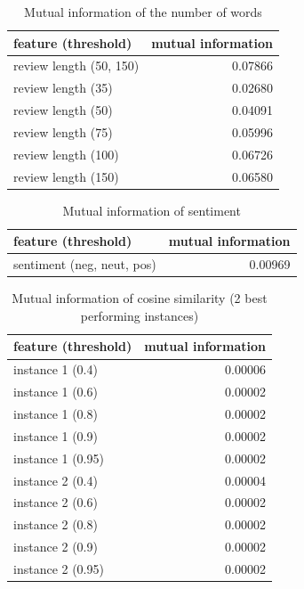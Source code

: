 \begin{table}[h!]

\centering
\begin{tabular}{lr}
\toprule
\textbf{feature (threshold)} & \textbf{mutual information} \\
\midrule
review length (50, 150) & 0.07866 \\
review length (35) & 0.02680 \\
review length (50) & 0.04091 \\
review length (75) & 0.05996 \\
review length (100) & 0.06726 \\
review length (150) & 0.06580 \\

\bottomrule
\end{tabular}
\caption{Mutual information of the number of words}\label{tab:mi_words}
\end{table}

\begin{table}[h!]
\centering
\begin{tabular}{lr}
\toprule
\textbf{feature (threshold)} & \textbf{mutual information} \\
\midrule
sentiment (neg, neut, pos) & 0.00969 \\
\bottomrule
\end{tabular}
\caption{Mutual information of sentiment}\label{tab:mi_sentiment}
\end{table}



\begin{table}[h!]
\centering
\begin{tabular}{lr}
\toprule
\textbf{feature (threshold)} & \textbf{mutual information} \\
\midrule
instance 1 (0.4) & 0.00006 \\
instance 1 (0.6) & 0.00002 \\
instance 1 (0.8) & 0.00002 \\
instance 1 (0.9) & 0.00002 \\
instance 1 (0.95) & 0.00002 \\
instance 2 (0.4) & 0.00004 \\
instance 2 (0.6) & 0.00002 \\
instance 2 (0.8) & 0.00002 \\
instance 2 (0.9) & 0.00002 \\
instance 2 (0.95) & 0.00002 \\
\bottomrule
\end{tabular}
\caption{Mutual information of cosine similarity (2 best performing instances)}\label{tab:mi_cossim}
\end{table}

